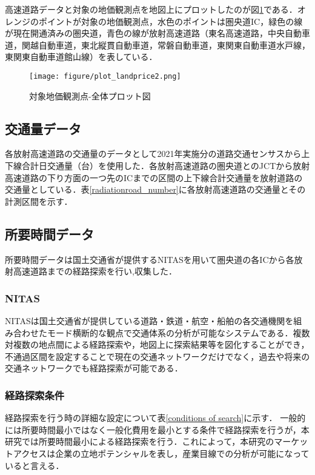 高速道路データと対象の地価観測点を地図上にプロットしたのが図\ref{plot_landprice}である．オレンジのポイントが対象の地価観測点，水色のポイントは圏央道IC，緑色の線が現在開通済みの圏央道，青色の線が放射高速道路（東名高速道路，中央自動車道，関越自動車道，東北縦貫自動車道，常磐自動車道，東関東自動車道水戸線，東関東自動車道館山線）を表している．
\begin{figure}[H]
  \centering
  \texttt{[image: figure/plot\_landprice2.png]}
  \caption{対象地価観測点-全体プロット図}
  \label{plot_landprice}
\end{figure}

\subsection{交通量データ}
各放射高速道路の交通量のデータとして2021年実施分の道路交通センサスから上下線合計日交通量（台）を使用した．各放射高速道路の圏央道とのJCTから放射高速道路の下り方面の一つ先のICまでの区間の上下線合計交通量を放射道路の交通量としている．表\ref{radiationroad_number}に各放射高速道路の交通量とその計測区間を示す．


\subsection{所要時間データ}
所要時間データは国土交通省が提供するNITASを用いて圏央道の各ICから各放射高速道路までの経路探索を行い,収集した．

\subsubsection{NITAS}
NITASは国土交通省が提供している道路・鉄道・航空・船舶の各交通機関を組み合わせたモード横断的な観点で交通体系の分析が可能なシステムである．複数対複数の地点間による経路探索や，地図上に探索結果等を図化することができ，不通過区間を設定することで現在の交通ネットワークだけでなく，過去や将来の交通ネットワークでも経路探索が可能である．\cite{NITAS}

\subsubsection{経路探索条件}
経路探索を行う時の詳細な設定について表\ref{conditions of search}に示す．
一般的には所要時間最小ではなく一般化費用を最小とする条件で経路探索を行うが，本研究では所要時間最小による経路探索を行う．これによって，本研究のマーケットアクセスは企業の立地ポテンシャルを表し，産業目線での分析が可能になっていると言える．


